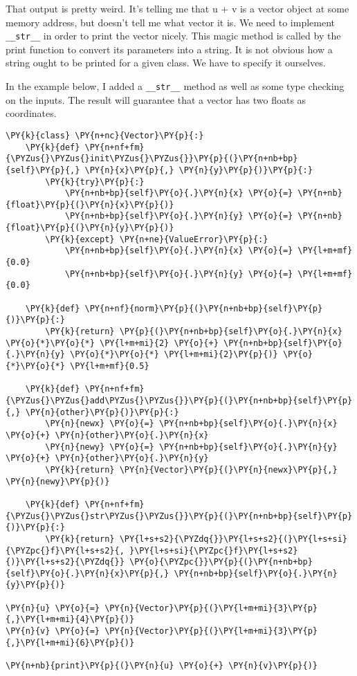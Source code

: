 That output is pretty weird.  It's telling me that u + v is a vector object at some memory address, but doesn't tell me what vector it is.  We need to implement \texttt{\_\_str\_\_} in order to print the vector nicely.  This magic method is called by the print function to convert its parameters into a string.  It is not obvious how a string ought to be printed for a given class.  We have to specify it ourselves.


In the example below, I added a \texttt{\_\_str\_\_} method as well as some type checking on the inputs.  The result will guarantee that a vector has two floats as coordinates.


\begin{Verbatim}[commandchars=\\\{\}]
\PY{k}{class} \PY{n+nc}{Vector}\PY{p}{:}
    \PY{k}{def} \PY{n+nf+fm}{\PYZus{}\PYZus{}init\PYZus{}\PYZus{}}\PY{p}{(}\PY{n+nb+bp}{self}\PY{p}{,} \PY{n}{x}\PY{p}{,} \PY{n}{y}\PY{p}{)}\PY{p}{:}
        \PY{k}{try}\PY{p}{:}
            \PY{n+nb+bp}{self}\PY{o}{.}\PY{n}{x} \PY{o}{=} \PY{n+nb}{float}\PY{p}{(}\PY{n}{x}\PY{p}{)}
            \PY{n+nb+bp}{self}\PY{o}{.}\PY{n}{y} \PY{o}{=} \PY{n+nb}{float}\PY{p}{(}\PY{n}{y}\PY{p}{)}
        \PY{k}{except} \PY{n+ne}{ValueError}\PY{p}{:}
            \PY{n+nb+bp}{self}\PY{o}{.}\PY{n}{x} \PY{o}{=} \PY{l+m+mf}{0.0}
            \PY{n+nb+bp}{self}\PY{o}{.}\PY{n}{y} \PY{o}{=} \PY{l+m+mf}{0.0}

    \PY{k}{def} \PY{n+nf}{norm}\PY{p}{(}\PY{n+nb+bp}{self}\PY{p}{)}\PY{p}{:}
        \PY{k}{return} \PY{p}{(}\PY{n+nb+bp}{self}\PY{o}{.}\PY{n}{x} \PY{o}{*}\PY{o}{*} \PY{l+m+mi}{2} \PY{o}{+} \PY{n+nb+bp}{self}\PY{o}{.}\PY{n}{y} \PY{o}{*}\PY{o}{*} \PY{l+m+mi}{2}\PY{p}{)} \PY{o}{*}\PY{o}{*} \PY{l+m+mf}{0.5}

    \PY{k}{def} \PY{n+nf+fm}{\PYZus{}\PYZus{}add\PYZus{}\PYZus{}}\PY{p}{(}\PY{n+nb+bp}{self}\PY{p}{,} \PY{n}{other}\PY{p}{)}\PY{p}{:}
        \PY{n}{newx} \PY{o}{=} \PY{n+nb+bp}{self}\PY{o}{.}\PY{n}{x} \PY{o}{+} \PY{n}{other}\PY{o}{.}\PY{n}{x}
        \PY{n}{newy} \PY{o}{=} \PY{n+nb+bp}{self}\PY{o}{.}\PY{n}{y} \PY{o}{+} \PY{n}{other}\PY{o}{.}\PY{n}{y}
        \PY{k}{return} \PY{n}{Vector}\PY{p}{(}\PY{n}{newx}\PY{p}{,} \PY{n}{newy}\PY{p}{)}

    \PY{k}{def} \PY{n+nf+fm}{\PYZus{}\PYZus{}str\PYZus{}\PYZus{}}\PY{p}{(}\PY{n+nb+bp}{self}\PY{p}{)}\PY{p}{:}
        \PY{k}{return} \PY{l+s+s2}{\PYZdq{}}\PY{l+s+s2}{(}\PY{l+s+si}{\PYZpc{}f}\PY{l+s+s2}{, }\PY{l+s+si}{\PYZpc{}f}\PY{l+s+s2}{)}\PY{l+s+s2}{\PYZdq{}} \PY{o}{\PYZpc{}}\PY{p}{(}\PY{n+nb+bp}{self}\PY{o}{.}\PY{n}{x}\PY{p}{,} \PY{n+nb+bp}{self}\PY{o}{.}\PY{n}{y}\PY{p}{)}

\PY{n}{u} \PY{o}{=} \PY{n}{Vector}\PY{p}{(}\PY{l+m+mi}{3}\PY{p}{,}\PY{l+m+mi}{4}\PY{p}{)}
\PY{n}{v} \PY{o}{=} \PY{n}{Vector}\PY{p}{(}\PY{l+m+mi}{3}\PY{p}{,}\PY{l+m+mi}{6}\PY{p}{)}

\PY{n+nb}{print}\PY{p}{(}\PY{n}{u} \PY{o}{+} \PY{n}{v}\PY{p}{)}
\end{Verbatim}

